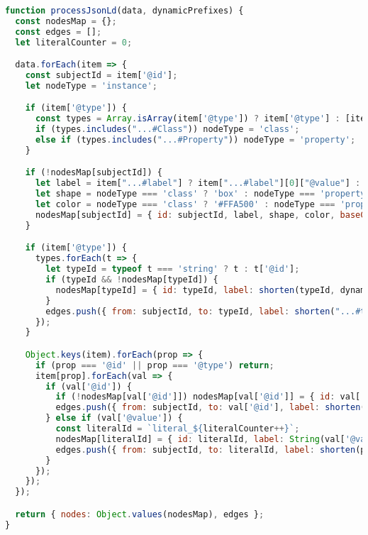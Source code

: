 \begin{lstlisting}[caption={\texttt{processJsonLd} function used for graph construction}, label={lst:rdf-visualizer}, language=JavaScript]
function processJsonLd(data, dynamicPrefixes) {
  const nodesMap = {};
  const edges = [];
  let literalCounter = 0;

  data.forEach(item => {
    const subjectId = item['@id'];
    let nodeType = 'instance';

    if (item['@type']) {
      const types = Array.isArray(item['@type']) ? item['@type'] : [item['@type']];
      if (types.includes("...#Class")) nodeType = 'class';
      else if (types.includes("...#Property")) nodeType = 'property';
    }

    if (!nodesMap[subjectId]) {
      let label = item["...#label"] ? item["...#label"][0]["@value"] : shorten(subjectId, dynamicPrefixes);
      let shape = nodeType === 'class' ? 'box' : nodeType === 'property' ? 'diamond' : 'dot';
      let color = nodeType === 'class' ? '#FFA500' : nodeType === 'property' ? '#ADFF2F' : '#97C2FC';
      nodesMap[subjectId] = { id: subjectId, label, shape, color, baseColor: color, nodeType, font: { color: "#000000" } };
    }

    if (item['@type']) {
      types.forEach(t => {
        let typeId = typeof t === 'string' ? t : t['@id'];
        if (typeId && !nodesMap[typeId]) {
          nodesMap[typeId] = { id: typeId, label: shorten(typeId, dynamicPrefixes), shape: 'box', color: '#FFA500', ... };
        }
        edges.push({ from: subjectId, to: typeId, label: shorten("...#type", dynamicPrefixes), dashes: true, color: { color: '#000' } });
      });
    }

    Object.keys(item).forEach(prop => {
      if (prop === '@id' || prop === '@type') return;
      item[prop].forEach(val => {
        if (val['@id']) {
          if (!nodesMap[val['@id']]) nodesMap[val['@id']] = { id: val['@id'], label: shorten(val['@id'], dynamicPrefixes), shape: 'dot', ... };
          edges.push({ from: subjectId, to: val['@id'], label: shorten(prop, dynamicPrefixes), arrows: 'to', ... });
        } else if (val['@value']) {
          const literalId = `literal_${literalCounter++}`;
          nodesMap[literalId] = { id: literalId, label: String(val['@value']), shape: 'box', color: '#FFD700', ... };
          edges.push({ from: subjectId, to: literalId, label: shorten(prop, dynamicPrefixes), arrows: 'to', ... });
        }
      });
    });
  });

  return { nodes: Object.values(nodesMap), edges };
}
\end{lstlisting}

